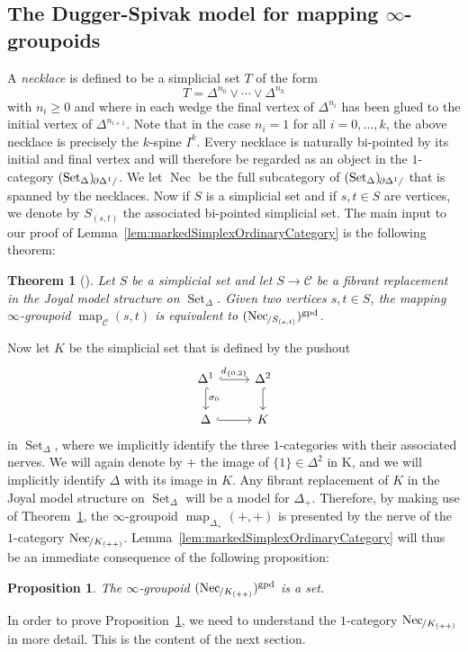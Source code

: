 \documentclass[reqno]{amsart}
\numberwithin{equation}{subsection}
\theoremstyle{plain}
\newtheorem{theorem}[equation]{Theorem}
\newtheorem{proposition}[equation]{Proposition}
\theoremstyle{definition}
\let\scr=\mathcal
\def\CC{\scr C}
\DeclareMathOperator{\Set}{Set}
\DeclareMathOperator{\Map}{map}
\DeclareMathOperator{\Nec}{Nec}
\newcommand{\gp}{\mathrm{gpd}}
\newcommand{\map}[1]{\Map_{#1}}
\newcommand{\Over}[2]{#1_{\hspace{-1pt}/#2}}
\newcommand{\Under}[2]{#1_{\hspace{-1pt}#2/}}
\newcommand{\Simp}[1]{#1_{\Delta}}
\begin{document}
\subsection{The Dugger-Spivak model for mapping $\infty$-groupoids}
A \emph{necklace} is defined to be a simplicial set $T$ of the form
\begin{equation*}
T=\Delta^{n_0}\vee\cdots\vee \Delta^{n_k}
\end{equation*}
with $n_i\geq 0$ and where in each wedge the final vertex of $\Delta^{n_i}$ has been glued to the initial vertex of $\Delta^{n_{i+1}}$. Note that in the case $n_i=1$ for all $i=0,\dots,k$, the above necklace is precisely the $k$-spine $I^k$. Every necklace is naturally bi-pointed by its initial and final vertex and will therefore be regarded as an object in the $1$-category $\Under{(\Simp\Set)}{\partial\Delta^1}$. We let $\Nec$ be the full subcategory of $\Under{(\Simp\Set)}{\partial\Delta^1}$ that is spanned by the necklaces. Now if $S$ is a simplicial set and if $s,t\in S$ are vertices, we denote by $S_{(s,t)}$ the associated bi-pointed simplicial set. The main input to our proof of Lemma~\ref{lem:markedSimplexOrdinaryCategory} is the following theorem:
\begin{theorem}[{\cite[Theorem~1.2]{Dugger2011}}]
	\label{thm:DuggerSpivak}
	Let $S$ be a simplicial set and let $S\to\CC$ be a fibrant replacement in the Joyal model structure on $\Simp\Set$. Given two vertices $s,t\in S$, the mapping $\infty$-groupoid $\map{\CC}(s,t)$ is equivalent to $(\Over{\Nec}{S_{(s,t)}})^\gp$.
\end{theorem}
Now let $K$ be the simplicial set that is defined by the pushout
\begin{equation*}
\begin{tikzcd}
\Delta^1\arrow[d, "\sigma_0", hookrightarrow]\arrow[r, hookrightarrow, "d_{\{0,2\}}"] & \Delta^2\arrow[d, hookrightarrow]\\
\Delta\arrow[r, hookrightarrow] & K
\end{tikzcd}
\end{equation*}
in $\Simp\Set$, where we implicitly identify the three $1$-categories with their associated nerves. We will again denote by $+$ the image of $\{1\}\in\Delta^2$ in K, and we will implicitly identify $\Delta$ with its image in $K$. Any fibrant replacement of $K$ in the Joyal model structure on $\Simp\Set$ will be a model for $\Delta_+$. Therefore, by making use of Theorem~\ref{thm:DuggerSpivak}, the $\infty$-groupoid $\map{\Delta_+}(+,+)$ is presented by the nerve of the $1$-category $\Over{\Nec}{K_{(++)}}$. Lemma~\ref{lem:markedSimplexOrdinaryCategory} will thus be an immediate consequence of the following proposition:
\begin{proposition}
	\label{prop:HomotopyTypeNecklaces}
	The $\infty$-groupoid $(\Over{\Nec}{K_{(++)}})^\gp$ is a set.
\end{proposition}
In order to prove Proposition~\ref{prop:HomotopyTypeNecklaces}, we need to understand the $1$-category $\Over{\Nec}{K_{(++)}}$ in more detail. This is the content of the next section.
\end{document}
